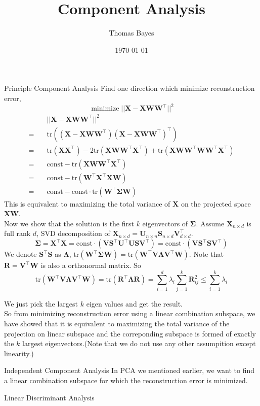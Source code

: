 \documentclass{beamer}
\title{Component Analysis}
\author{Thomas Bayes}
\institute{
\texttt{[image: ../bayes.png]}%
}
\date{\today}
\def\X{\mathbf{X}}
\def\w{\mathbf{w}}
\def\W{\mathbf{W}}
\def\const{\mathrm{const}}
\def\Var{\mathrm{Var}}
\def\tr{\mathrm{tr}}
\def\T{\top}
\def\U{\mathbf{U}}
\def\S{\mathbf{S}}
\def\V{\mathbf{V}}
\newcommand{\minimize}{\mathop{\mathrm{minimize}}}
\newcommand{\maximize}{\mathop{\mathrm{maximize}}}
\begin{document}
    
\frame{\titlepage}

\begin{frame}[allowframebreaks]{Principle Component Analysis}
Find one direction which minimize reconstruction error,
$$\minimize ||\X - \X \W \W^\T||^2 $$
\begin{align*}
& ||\X - \X \W \W^\T||^2 \\
= \quad & \tr ((\X - \X \W \W^\T) (\X - \X \W \W^\T)^\T) \\
= \quad & \tr(\X \X^\T) - 2 \tr(\X \W \W^\T \X^\T) + \tr (\X \W \W^\T \W \W^\T \X^\T) \\ 
= \quad & \const - \tr (\X \W \W^\T \X^\T) \\
= \quad & \const - \tr (\W^\T \X^\T \X  \W) \\
= \quad & \const - \const \cdot \tr (\W^\T \mathbf{\Sigma} \W)
\end{align*}
This is equivalent to maximizing the total variance of $\X$ on the projected space $\X\W$. \\
\framebreak
Now we show that the solution is the first $k$ eigenvectors of $\mathbf{\Sigma}$. Assume $\X_{n \times d}$ is full rank $d$, SVD decomposition of 
$\X_{n \times d} = \U_{n \times n} \S_{n \times d} \V_{d \times d}^\T$. $$\mathbf{\Sigma} = \X^\T \X = \const \cdot (\V \S^\T \U^\T \U \S \V^\T) = \const \cdot (\V \S^\T \S \V^\T)$$
We denote $\S^\T \S$ as $\mathbf{\Lambda}$, $\tr (\W^\T \mathbf{\Sigma} \W) = \tr (\W^\T \V \mathbf{\Lambda} \V^\T \W)$. Note that $\mathbf{R} = \V^\T \W$ is also a orthonormal matrix. So $$\tr (\W^\T \V \mathbf{\Lambda} \V^\T \W) = \tr (\mathbf{R}^\T \mathbf{\Lambda} \mathbf{R}) = \sum_{i=1}^d \lambda_i \sum_{j=1}^k\mathbf{R}_{ij}^2 \le \sum_{i=1}^k \lambda_i$$

We just pick the largest $k$ eigen values and get the result. \\
\framebreak
So from minimizing reconstruction error using a linear combination subspace, we have showed that it is equivalent to maximizing the total variance of the projection on linear subspace and the correponding subspace is formed of exactly the $k$ largest eigenvectors.(Note that we do not use any other assumpition except linearity.)
\end{frame}

\begin{frame}[allowframebreaks]{Independent Component Analysis}
In PCA we mentioned earlier, we want to find a linear combination subspace for which the reconstruction error is minimized. 
\end{frame}

\begin{frame}[allowframebreaks]{Linear Discriminant Analysis}
\end{frame}
    
\end{document}
